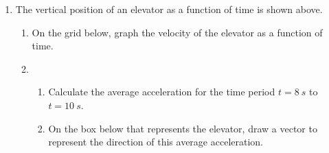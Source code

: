 \documentclass{../../../oss-apphys}
\begin{document}
\begin{enumerate}[leftmargin=15pt]


  \begin{center}
    \end{center}
\item The vertical position of an elevator as a function of time is shown above.
  \begin{enumerate}[nosep]
  \item On the grid below, graph the velocity of the elevator as a function of
    time.
    \begin{center}
    \end{center}
    \newpage
    
  \item 
    \begin{enumerate}[nosep]
    \item Calculate the average acceleration for the time period $t=\SI{8}{s}$
      to $t=\SI{10}{s}$.
    \item On the box below that represents the elevator, draw a vector to
      represent the direction of this average acceleration.
      \begin{center}
        \vspace{1in}
      \end{center}
    \end{enumerate}
    \vspace{1in}
    

\end{enumerate}
\end{enumerate}
\end{document}
